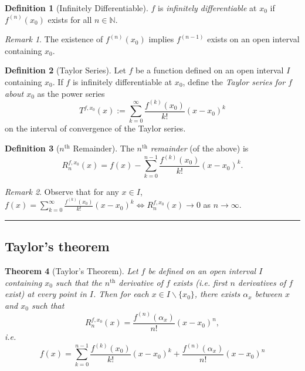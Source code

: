 \documentclass[12pt, lettersize]{book}
\theoremstyle{plain}
\newtheorem{thm}{Theorem}[section]
\theoremstyle{definition}
\newtheorem{dfn}[thm]{Definition}
\theoremstyle{remark}
\newtheorem*{rem}{Remark}
\newcommand{\N}{\mathbb{N}}
\newcommand{\lline}{\noindent\rule{\textwidth}{1pt}}
\begin{document}
		\begin{dfn}[Infinitely Differentiable]
			$f$ is \emph{infinitely differentiable} at $x_0$ if $f^{(n)}(x_0)$ exists for all $n\in\N$.
		\end{dfn}
		\begin{rem}
			The existence of $f^{(n)}(x_0)$ implies $f^{(n-1)}$ exists on an open interval containing $x_0$.
		\end{rem}
		
		\begin{dfn}[Taylor Series]
			Let $f$ be a function defined on an open interval $I$ containing $x_0$. If $f$ is infinitely differentiable at $x_0$, define the \emph{Taylor series for $f$ about $x_0$} as the power series
			\begin{displaymath}
				T^{f,x_0}(x):=\sum_{k=0}^{\infty}\frac{f^{(k)}(x_0)}{k!}(x-x_0)^k
			\end{displaymath}
			on the interval of convergence of the Taylor series.
		\end{dfn}
		
		\begin{dfn}[$n^\text{th}$ Remainder]
			The $n^\text{th}$ \emph{remainder} (of the above) is 
			\begin{displaymath}
				R_n^{f,x_0}(x)=f(x)-\sum_{k=0}^{n-1}\frac{f^{(k)}(x_0)}{k!}(x-x_0)^k.
			\end{displaymath}
		\end{dfn}
		\begin{rem}
			Observe that for any $x\in I$, $f(x)=\sum_{k=0}^{\infty}\frac{f^{(k)}(x_0)}{k!}(x-x_0)^k\iff R_n^{f,x_0}(x)\rightarrow0$ as $n\rightarrow\infty$.
		\end{rem}
		\lline
		\newpage
		\subsection*{Taylor's theorem}
		\begin{thm}[Taylor's Theorem]
			Let $f$ be defined on an open interval $I$ containing $x_0$ such that the $n^\text{th}$ derivative of $f$ exists (i.e. first $n$ derivatives of $f$ exist) at every point in $I$. Then for each $x\in I\backslash\{x_0\}$, there exists $\alpha_x$ between $x$ and $x_0$ such that
			\begin{displaymath}
				R_n^{f,x_0}(x)=\frac{f^{(n)}(\alpha_x)}{n!}(x-x_0)^n,
			\end{displaymath}
			i.e.
			\begin{displaymath}
				f(x)=\sum_{k=0}^{n-1}\frac{f^{(k)}(x_0)}{k!}(x-x_0)^k+\frac{f^{(n)}(\alpha_x)}{n!}(x-x_0)^n
			\end{displaymath}
		\end{thm}
		
\end{document}
